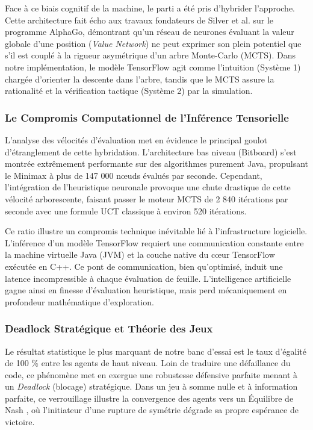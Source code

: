 \documentclass[a4paper]{article}
\begin{document}
Face à ce biais cognitif de la machine, le parti a été pris d'hybrider l'approche. Cette architecture fait écho aux travaux fondateurs de Silver et al. \cite{silver2016mastering} sur le programme AlphaGo, démontrant qu'un réseau de neurones évaluant la valeur globale d'une position (\textit{Value Network}) ne peut exprimer son plein potentiel que s'il est couplé à la rigueur asymétrique d'un arbre Monte-Carlo (MCTS). Dans notre implémentation, le modèle TensorFlow agit comme l'intuition (Système 1) chargée d'orienter la descente dans l'arbre, tandis que le MCTS assure la rationalité et la vérification tactique (Système 2) par la simulation.

\subsubsection{Le Compromis Computationnel de l'Inférence Tensorielle}

L'analyse des vélocités d'évaluation met en évidence le principal goulot d'étranglement de cette hybridation. L'architecture bas niveau (Bitboard) s'est montrée extrêmement performante sur des algorithmes purement Java, propulsant le Minimax à plus de 147 000 nœuds évalués par seconde. Cependant, l'intégration de l'heuristique neuronale provoque une chute drastique de cette vélocité arborescente, faisant passer le moteur MCTS de 2 840 itérations par seconde avec une formule UCT classique à environ 520 itérations. 

Ce ratio illustre un compromis technique inévitable lié à l'infrastructure logicielle. L'inférence d'un modèle TensorFlow requiert une communication constante entre la machine virtuelle Java (JVM) et la couche native du cœur TensorFlow exécutée en C++. Ce pont de communication, bien qu'optimisé, induit une latence incompressible à chaque évaluation de feuille. L'intelligence artificielle gagne ainsi en finesse d'évaluation heuristique, mais perd mécaniquement en profondeur mathématique d'exploration.

\subsubsection{Deadlock Stratégique et Théorie des Jeux}

Le résultat statistique le plus marquant de notre banc d'essai est le taux d'égalité de 100 \% entre les agents de haut niveau. Loin de traduire une défaillance du code, ce phénomène met en exergue une robustesse défensive parfaite menant à un \textit{Deadlock} (blocage) stratégique. Dans un jeu à somme nulle et à information parfaite, ce verrouillage illustre la convergence des agents vers un Équilibre de Nash \cite{neumann1944theory}, où l'initiateur d'une rupture de symétrie dégrade sa propre espérance de victoire.
\end{document}
